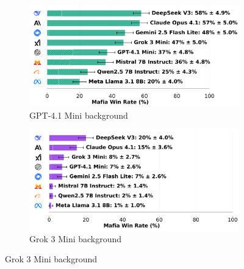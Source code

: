 \documentclass{article}
\begin{document}
\begin{figure}[htbp]
    \centering
    \begin{subfigure}[b]{0.48\textwidth}
        \centering
        \includegraphics[width=\textwidth]{../results/mafioso_gpt-4.1_mini_db_benchmark.png}
        \caption{GPT-4.1 Mini background}
        \label{fig:mafioso_gpt41mini_appendix}
    \end{subfigure}
    \hfill
    \begin{subfigure}[b]{0.48\textwidth}
        \centering
        \includegraphics[width=\textwidth]{../results/mafioso_grok_3_mini_db_benchmark.png}
        \caption{Grok 3 Mini background}
        \label{fig:mafioso_grok3_appendix}
    \end{subfigure}
    
    \vspace{0.5cm}
    

\end{figure}
\end{document}
